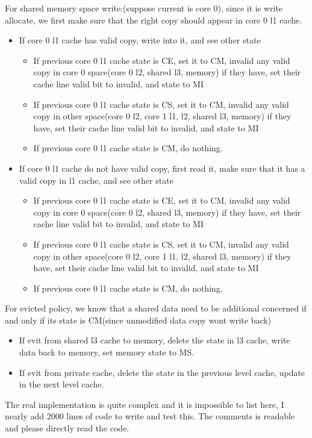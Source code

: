 \mathbb{R} \documentclass{article}
\begin{document}
For shared memory space write:(suppose current is core 0), since it is write allocate, we first make sure that the right copy should appear in core 0 l1 cache.
\begin{itemize}
  \item If core 0 l1 cache has valid copy, write into it, and see other state
    \begin{itemize}
      \item If previous core 0 l1 cache state is CE, set it to CM, invalid any valid copy in core 0 space(core 0 l2, shared l3, memory) if they have, set their cache line valid bit to invalid, and state to MI
      \item If previous core 0 l1 cache state is CS, set it to CM, invalid any valid copy in other space(core 0 l2, core 1 l1, l2, shared l3, memory) if they have, set their cache line valid bit to invalid, and state to MI
      \item If previous core 0 l1 cache state is CM, do nothing.
    \end{itemize}
  \item If core 0 l1 cache do not have valid copy, first read it, make sure that it has a valid copy in l1 cache, and see other state
    \begin{itemize}
      \item If previous core 0 l1 cache state is CE, set it to CM, invalid any valid copy in core 0 space(core 0 l2, shared l3, memory) if they have, set their cache line valid bit to invalid, and state to MI
      \item If previous core 0 l1 cache state is CS, set it to CM, invalid any valid copy in other space(core 0 l2, core 1 l1, l2, shared l3, memory) if they have, set their cache line valid bit to invalid, and state to MI
      \item If previous core 0 l1 cache state is CM, do nothing.
    \end{itemize}
\end{itemize}
For evicted policy, we know that a shared data need to be additional concerned if and only if its state is CM(since unmodified data copy wont write back)
\begin{itemize}
  \item If evit from shared l3 cache to memory, delete the state in l3 cache, write data back to memory, set memory state to MS.
  \item If evit from private cache, delete the state in the previous level cache, update in the next level cache.
\end{itemize}
The real implementation is quite complex and it is impossible to list here, I nearly add 2000 lines of code to write and test this. The comments is readable and please directly read the code.
\end{document}
